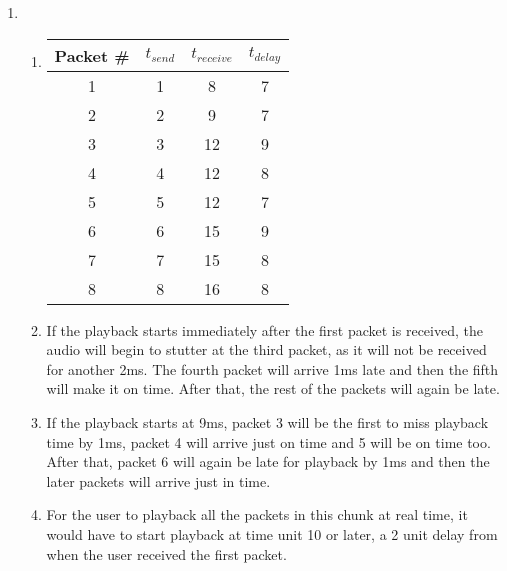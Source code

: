 \documentclass[12pt]{article}
\begin{document}
\begin{enumerate}
	\item \begin{enumerate}

			\item \begin{tabular}{c|c c c}
					Packet \# & $t_{send}$ & $t_{receive}$ & $t_{delay}$\\
					\hline
					1 & 1 & 8 & 7\\
					2 & 2 & 9 & 7\\
					3 & 3 & 12 & 9\\
					4 & 4 & 12 & 8\\
					5 & 5 & 12 & 7\\
					6 & 6 & 15 & 9\\
					7 & 7 & 15 & 8\\
					8 & 8 & 16 & 8\\

				\end{tabular}

			\item If the playback starts immediately after the first packet is received, the audio will begin to stutter at the third packet, as it will not be received for another 2ms. The fourth packet will arrive 1ms late and then the fifth will make it on time. After that, the rest of the packets will again be late.
			\item If the playback starts at 9ms, packet 3 will be the first to miss playback time by 1ms, packet 4 will arrive just on time and 5 will be on time too. After that, packet 6 will again be late for playback by 1ms and then the later packets will arrive just in time.
			\item For the user to playback all the packets in this chunk at real time, it would have to start playback at time unit 10 or later, a 2 unit delay from when the user received the first packet.

		\end{enumerate}

\end{enumerate}
\end{document}
